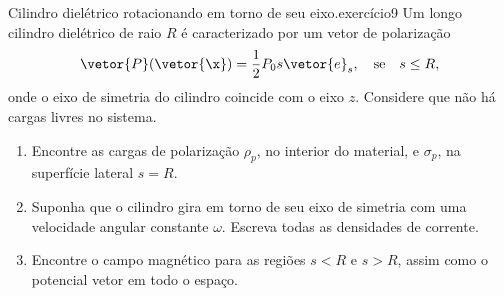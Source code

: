 \begin{exercício}{Cilindro dielétrico rotacionando em torno de seu eixo.}{exercício9}
    Um longo cilindro dielétrico de raio \(R\) é caracterizado por um vetor de polarização
    \begin{equation*}
        \vetor{P}(\vetor{\x}) = \frac12P_0 s\vetor{e}_s,\quad\text{se}\quad s \leq R,
    \end{equation*}
    onde o eixo de simetria do cilindro coincide com o eixo \(z\). Considere que não há cargas livres no sistema.
    \begin{enumerate}[label=(\alph*)]
        \item Encontre as cargas de polarização \(\rho_p\), no interior do material, e \(\sigma_p\), na superfície lateral \(s = R\).
        \item Suponha que o cilindro gira em torno de seu eixo de simetria com uma velocidade angular constante \(\omega\). Escreva todas as densidades de corrente.
        \item Encontre o campo magnético para as regiões \(s < R\) e \(s > R\), assim como o potencial vetor em todo o espaço.
    \end{enumerate}
\end{exercício}
